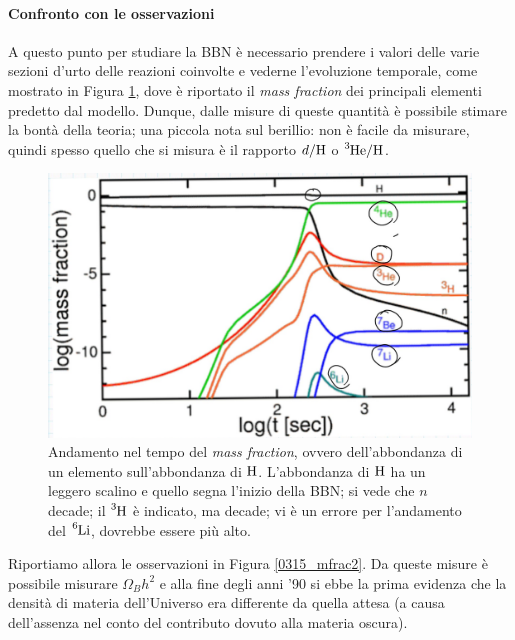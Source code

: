 \paragraph{Confronto con le osservazioni} A questo punto per studiare la BBN è necessario prendere i valori delle varie sezioni d'urto delle reazioni coinvolte e vederne l'evoluzione temporale, come mostrato in Figura \ref{0315_mfrac}, dove è riportato il \textit{mass fraction} dei principali elementi predetto dal modello. Dunque, dalle misure di queste quantità è possibile stimare la bontà della teoria; una piccola nota sul berillio: non è facile da misurare, quindi spesso quello che si misura è il rapporto $d/\ce{H}$ o $\ce{^3He/H}$.

\begin{figure}[h]
    \centering
    \includegraphics[scale=0.2]{Immagini/0315_massfraction.png}
    \caption{Andamento nel tempo del \textit{mass fraction}, ovvero dell'abbondanza di un elemento sull'abbondanza di $\ce{H}$. L'abbondanza di $\ce{H}$ ha un leggero scalino e quello segna l'inizio della BBN; si vede che $n$ decade; il $\ce{^3H}$ è indicato, ma decade; vi è un errore per l'andamento del $\ce{^6Li}$, dovrebbe essere più alto.}
    \label{0315_mfrac}
\end{figure}

\noindent Riportiamo allora le osservazioni in Figura \ref{0315_mfrac2}. Da queste misure è possibile misurare $\Omega_B h^2$ e alla fine degli anni '90 si ebbe la prima evidenza che la densità di materia dell'Universo era differente da quella attesa (a causa dell'assenza nel conto del contributo dovuto alla materia oscura). 

